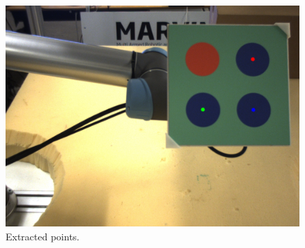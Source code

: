\documentclass[]{scrartcl}
\begin{document}
\begin{figure}
	\centering
	\includegraphics[width=0.7\linewidth]{fig/src0-1.png}
	\caption{Extracted points.}
	\label{fig:src1}
\end{figure}

\newpage
\end{document}
